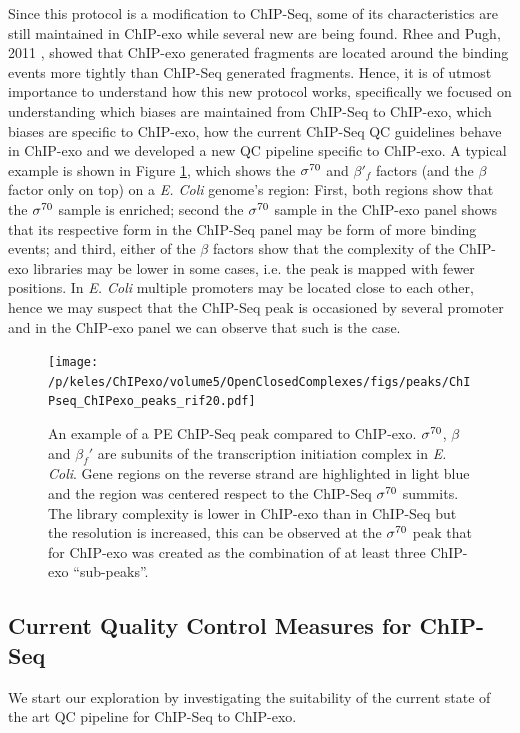 \documentclass[11pt]{article}\usepackage[]{graphicx}\usepackage[]{color}
\begin{document}
Since this protocol is a modification to ChIP-Seq, some of its
characteristics are still maintained in ChIP-exo while several new are
being found. Rhee and Pugh, 2011 \cite{exo1}, showed that ChIP-exo
generated fragments are located around the binding events more tightly
than ChIP-Seq generated fragments. Hence, it is of utmost importance
to understand how this new protocol works, specifically we focused on
understanding which biases are maintained from ChIP-Seq to ChIP-exo,
which biases are specific to ChIP-exo, how the current ChIP-Seq QC
guidelines behave in ChIP-exo and we developed a new QC pipeline
specific to ChIP-exo. A typical example is shown in Figure
\ref{fig:exo_example}, which shows the $\sigma^{70}$ and $\beta'_f$ factors
(and the $\beta$ factor only on top) on a \emph{E. Coli} genome's
region: First, both regions show that the $\sigma^{70}$ sample is enriched;
second the $\sigma^{70}$ sample in the ChIP-exo panel shows that its
respective form in the ChIP-Seq panel may be form of more binding
events; and third, either of the $\beta$ factors show that the
complexity of the ChIP-exo libraries may be lower in some cases,
i.e. the peak is mapped with fewer positions. In \emph{E. Coli}
multiple promoters may be located close to each other, hence we may
suspect that the ChIP-Seq peak is occasioned by several promoter and
in the ChIP-exo panel we can observe that such is the case.

\begin{figure}[H]
  \centering
  \texttt{[image: /p/keles/ChIPexo/volume5/OpenClosedComplexes/figs/peaks/ChIPseq\_ChIPexo\_peaks\_rif20.pdf]}
  \caption{An example of a PE ChIP-Seq peak compared to
    ChIP-exo. $\sigma^{70}$, $\beta$ and $\beta_f'$ are subunits of the
    transcription initiation complex in \emph{E. Coli}. Gene regions
    on the reverse strand are highlighted in light blue and the region
    was centered respect to the ChIP-Seq $\sigma^{70}$ summits. The library
    complexity is lower in ChIP-exo than in ChIP-Seq but the
    resolution is increased, this can be observed at the $\sigma^{70}$ peak
    that for ChIP-exo was created as the combination of at least three
    ChIP-exo ``sub-peaks''.}
  \label{fig:exo_example}
\end{figure}

\subsection{Current Quality Control Measures for ChIP-Seq}
\label{sec:QC_chipseq}

We start our exploration by investigating the suitability of the
current state of the art QC pipeline for ChIP-Seq to ChIP-exo.
\end{document}
